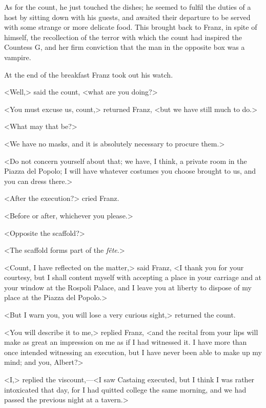  As for the count, he just touched the dishes; he seemed to fulfil the duties of a host by sitting down with his guests, and awaited their departure to be served with some strange or more delicate food. This brought back to Franz, in spite of himself, the recollection of the terror with which the count had inspired the Countess G\doubleemdash, and her firm conviction that the man in the opposite box was a vampire. 

 At the end of the breakfast Franz took out his watch. 

 <Well,> said the count, <what are you doing?> 

 <You must excuse us, count,> returned Franz, <but we have still much to do.> 

 <What may that be?> 

 <We have no masks, and it is absolutely necessary to procure them.> 

 <Do not concern yourself about that; we have, I think, a private room in the Piazza del Popolo; I will have whatever costumes you choose brought to us, and you can dress there.> 

 <After the execution?> cried Franz. 

 <Before or after, whichever you please.> 

 <Opposite the scaffold?> 

 <The scaffold forms part of the \textit{fête}.> 

 <Count, I have reflected on the matter,> said Franz, <I thank you for your courtesy, but I shall content myself with accepting a place in your carriage and at your window at the Rospoli Palace, and I leave you at liberty to dispose of my place at the Piazza del Popolo.> 

 <But I warn you, you will lose a very curious sight,> returned the count. 

 <You will describe it to me,> replied Franz, <and the recital from your lips will make as great an impression on me as if I had witnessed it. I have more than once intended witnessing an execution, but I have never been able to make up my mind; and you, Albert?> 

 <I,> replied the viscount,—<I saw Castaing executed, but I think I was rather intoxicated that day, for I had quitted college the same morning, and we had passed the previous night at a tavern.> 

